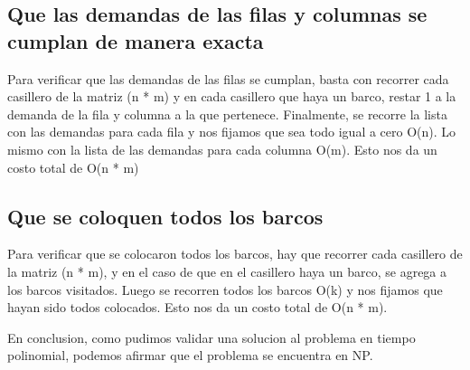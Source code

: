 \subsection{Que las demandas de las filas y columnas se cumplan de manera exacta}

    Para verificar que las demandas de las filas se cumplan, basta con recorrer cada casillero de la matriz (n * m) y en cada casillero que haya un barco, restar 1 a la demanda de la fila y columna a la que pertenece.
    Finalmente, se recorre la lista con las demandas para cada fila y nos fijamos que sea todo igual a cero O(n). Lo mismo con la lista de las demandas para cada columna O(m). 
    Esto nos da un costo total de O(n * m)

\subsection{Que se coloquen todos los barcos}

    Para verificar que se colocaron todos los barcos, hay que recorrer cada casillero de la matriz (n * m), y en el caso de que en el casillero haya un barco, se agrega a los barcos visitados.
    Luego se recorren todos los barcos O(k) y nos fijamos que hayan sido todos colocados. Esto nos da un costo total de O(n * m).

\vskip0.25cm
En conclusion, como pudimos validar una solucion al problema en tiempo polinomial, podemos afirmar que el problema se encuentra en NP.